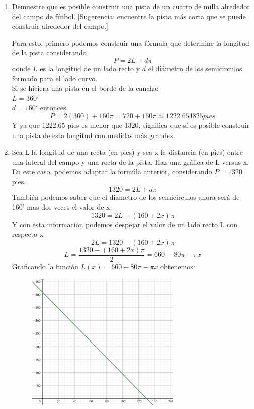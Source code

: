 \documentclass[12pt]{article}
\begin{document}
\begin{enumerate}[label=\alph*)]
\item Demuestre que es posible construir una pista de un cuarto de milla
alrededor del campo de fútbol. [Sugerencia: encuentre la
pista más corta que se puede construir alrededor del campo.]

Para esto, primero podemos construir una fórmula que determine la longitud de la pista considerando
\[
P = 2L + d\pi 
\]
donde $L$ es la longitud de un lado recto y $d$ el diámetro de los semicirculos formado para el lado curvo.\\
Si se hiciera una pista en el borde de la cancha:\\
$L = 360 '$\\
$d=160'$
entonces
\[
P = 2(360) + 160 \pi= 720 + 160\pi \approx 1222.654825 pies
\]
Y ya que 1222.65 pies es menor que 1320, significa que sí es posible construir una pista de esta longitud con medidas más grandes.

\item Sea L la longitud de una recta (en pies) y sea x
la distancia (en pies) entre una lateral del campo y una recta de la pista. Haz una gráfica de L versus x. \\
En este caso, podemos adaptar la formúla anterior, considerando $P=1320$ pies.
\[
1320 = 2L + d\pi  
\]
También podemos saber que el diametro de los semicirculos ahora será de 160' mas dos veces el valor de x.
\[
1320 = 2L + (160+2x)\pi  
\]
Y con esta información podemos despejar el valor de un lado recto L con respecto x
\[
2L = 1320 - (160+2x)\pi  
\]
\[
L =\frac{ 1320 - (160+2x)\pi  }{2} = 660-80 \pi -\pi x 
\]
Graficando la función $L(x) =  660-80 \pi -\pi x $ obtenemos:
\begin{figure}[h]
\centering
\includegraphics[width=0.7\textwidth]{img/pista.png}
\end{figure}


\end{enumerate}
\end{document}
